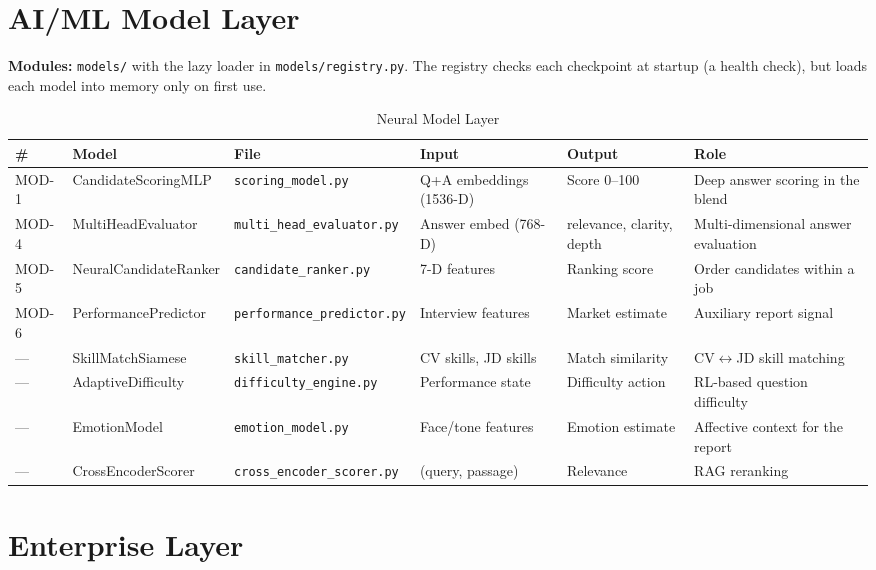 \documentclass[12pt,a4paper,oneside]{report}
\begin{document}
\section{AI/ML Model Layer}

\textbf{Modules:} \texttt{models/} with the lazy loader in \texttt{models/registry.py}. The
registry checks each checkpoint at startup (a health check), but loads each model into memory
only on first use.

\begin{table}[H]
\centering
\caption{Neural Model Layer}
\label{tab:models}
\begin{tabularx}{\textwidth}{C{0.6cm}L{3.2cm}L{2.5cm}L{2.3cm}L{2.0cm}X}
\toprule
\textbf{\#} & \textbf{Model} & \textbf{File} & \textbf{Input} & \textbf{Output} & \textbf{Role} \\
\midrule
MOD-1 & CandidateScoringMLP & \texttt{scoring\_model.py} & Q+A embeddings (1536-D) & Score 0--100 & Deep answer scoring in the blend \\
MOD-4 & MultiHeadEvaluator & \texttt{multi\_head\_evaluator.py} & Answer embed (768-D) & relevance, clarity, depth & Multi-dimensional answer evaluation \\
MOD-5 & NeuralCandidateRanker & \texttt{candidate\_ranker.py} & 7-D features & Ranking score & Order candidates within a job \\
MOD-6 & PerformancePredictor & \texttt{performance\_predictor.py} & Interview features & Market estimate & Auxiliary report signal \\
--- & SkillMatchSiamese & \texttt{skill\_matcher.py} & CV skills, JD skills & Match similarity & CV$\leftrightarrow$JD skill matching \\
--- & AdaptiveDifficulty & \texttt{difficulty\_engine.py} & Performance state & Difficulty action & RL-based question difficulty \\
--- & EmotionModel & \texttt{emotion\_model.py} & Face/tone features & Emotion estimate & Affective context for the report \\
--- & CrossEncoderScorer & \texttt{cross\_encoder\_scorer.py} & (query, passage) & Relevance & RAG reranking \\
\bottomrule
\end{tabularx}
\end{table}

\section{Enterprise Layer}
\end{document}
